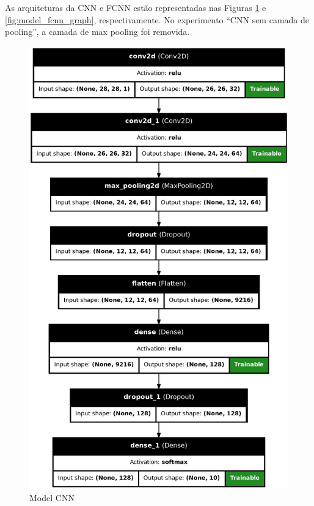 \documentclass[12pt]{article}
\begin{document}
As arquiteturas da CNN e FCNN estão representadas nas Figuras \ref{fig:model_cnn_graph} e \ref{fig:model_fcnn_graph}, respectivamente. No experimento “CNN sem camada de pooling”, a camada de max pooling foi removida.

\begin{figure}[H]
  \centering
  \begin{minipage}{0.4\textwidth}
    \centering
    \includegraphics[width=\textwidth]{../images/models/model_cnn_graph.png}
    \caption{Model CNN}
    \label{fig:model_cnn_graph}
  \end{minipage}%

\end{figure}
\end{document}
